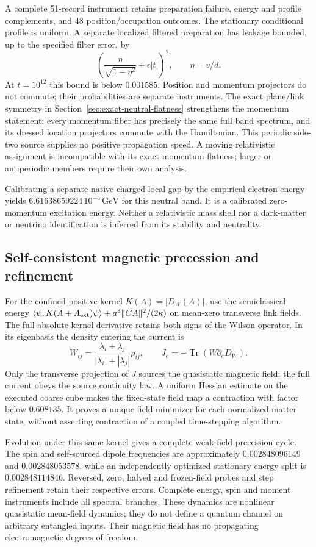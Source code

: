A complete 51-record instrument retains preparation failure, energy and
profile complements, and 48 position/occupation outcomes. The stationary
conditional profile is uniform. A separate localized filtered preparation
has leakage bounded, up to the specified filter error, by
\[
 \left(\frac{\eta}{\sqrt{1-\eta^2}}+\epsilon |t|\right)^2,
 \qquad \eta=v/d.
\]
At $t=10^{12}$ this bound is below $0.001585$. Position and momentum
projectors do not commute; their probabilities are separate instruments.
The exact plane/link symmetry in
Section~\ref{sec:exact-neutral-flatness} strengthens the momentum statement:
every momentum fiber has precisely the same full band spectrum, and its
dressed location projectors commute with the Hamiltonian. This periodic
side-two source supplies no positive propagation speed. A moving
relativistic assignment is incompatible with its exact momentum flatness;
larger or antiperiodic members require their own analysis.

Calibrating a separate native charged local gap by the empirical electron
energy yields $6.61638659224\,10^{-5}\,\mathrm{GeV}$ for this neutral
band. It is a calibrated zero-momentum excitation energy. Neither a
relativistic mass shell nor a dark-matter or neutrino identification is
inferred from its stability and neutrality.

\subsection{Self-consistent magnetic precession and refinement}
\label{sec:confined-magnetic-precession}

For the confined positive kernel $K(A)=|D_W(A)|$, use the semiclassical
energy $\langle\psi,K(A+A_{\rm ext})\psi\rangle+
 a^3\|CA\|^2/(2\kappa)$ on mean-zero transverse link fields.
The full absolute-kernel derivative retains both signs of the Wilson
operator. In its eigenbasis the density entering the current is
\[
 W_{ij}=\frac{\lambda_i+\lambda_j}{|\lambda_i|+|\lambda_j|}\rho_{ij},
 \qquad J_e=-\operatorname{Tr}(W\partial_eD_W).
\]
Only the transverse projection of $J$ sources the quasistatic magnetic
field; the full current obeys the source continuity law. A uniform
Hessian estimate on the executed coarse cube makes the fixed-state
field map a contraction with factor below $0.608135$. It proves a
unique field minimizer for each normalized matter state, without
asserting contraction of a coupled time-stepping algorithm.

Evolution under this same kernel gives a complete weak-field precession
cycle. The spin and self-sourced dipole frequencies are approximately
$0.002848096149$ and $0.002848053578$, while an independently optimized
stationary energy split is $0.002848114846$. Reversed, zero, halved and
frozen-field probes and step refinement retain their respective errors.
Complete energy, spin and moment instruments include all spectral
branches. These dynamics are nonlinear quasistatic mean-field dynamics;
they do not define a quantum channel on arbitrary entangled inputs.
Their magnetic field has no propagating electromagnetic degrees of freedom.

